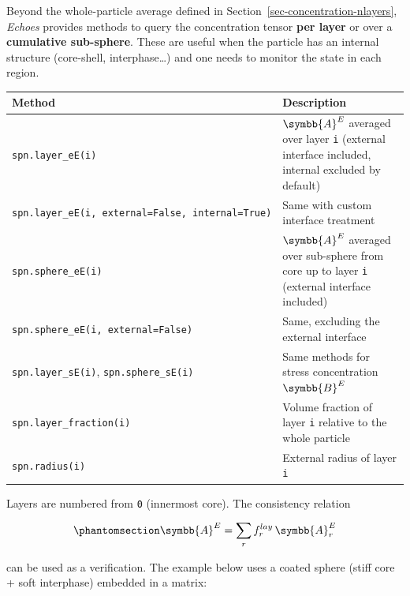 \documentclass[
  a4paper,
  numbers=noendperiod,
  DIV=12]{scrreprt}
\newcounter{none} %
\newcommand{\uuuu}[1]{{\symbb{{#1}}}}
\begin{document}
Beyond the whole-particle average defined in
Section~\ref{sec-concentration-nlayers}, \emph{Echoes} provides methods
to query the concentration tensor \textbf{per layer} or over a
\textbf{cumulative sub-sphere}. These are useful when the particle has
an internal structure (core-shell, interphase\ldots) and one needs to
monitor the state in each region.

{\def\LTcaptype{none} %
\begin{longtable}[]{@{}
  >{\raggedright\arraybackslash}p{}
  >{\raggedright\arraybackslash}p{}@{}}
\toprule\noalign{}
\begin{minipage}[b]{\linewidth}\raggedright
Method
\end{minipage} & \begin{minipage}[b]{\linewidth}\raggedright
Description
\end{minipage} \\
\midrule\noalign{}
\endhead
\bottomrule\noalign{}
\endlastfoot
\texttt{spn.layer\_eE(i)} & \(\uuuu{A}^E\) averaged over layer
\texttt{i} (external interface included, internal excluded by
default) \\
\texttt{spn.layer\_eE(i,\ external=False,\ internal=True)} & Same with
custom interface treatment \\
\texttt{spn.sphere\_eE(i)} & \(\uuuu{A}^E\) averaged over sub-sphere
from core up to layer \texttt{i} (external interface included) \\
\texttt{spn.sphere\_eE(i,\ external=False)} & Same, excluding the
external interface \\
\texttt{spn.layer\_sE(i)}, \texttt{spn.sphere\_sE(i)} & Same methods for
stress concentration \(\uuuu{B}^E\) \\
\texttt{spn.layer\_fraction(i)} & Volume fraction of layer \texttt{i}
relative to the whole particle \\
\texttt{spn.radius(i)} & External radius of layer \texttt{i} \\
\end{longtable}
}

Layers are numbered from \texttt{0} (innermost core). The consistency
relation

\begin{equation}\protect\phantomsection\label{eq-Ae-sum}{
\uuuu{A}^E = \sum_r f_r^{lay}\,\uuuu{A}^E_r
}\end{equation}

can be used as a verification. The example below uses a coated sphere
(stiff core + soft interphase) embedded in a matrix:
\end{document}
